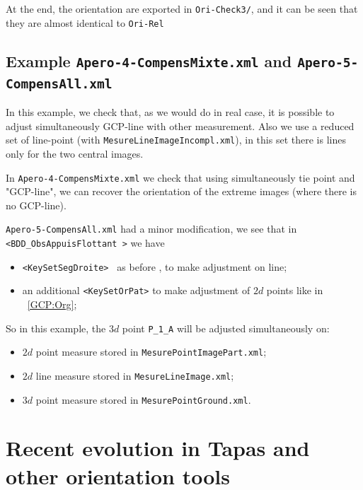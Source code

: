 At the end, the orientation are exported in {\tt Ori-Check3/}, and it can be seen that they are almost identical to {\tt Ori-Rel}



\subsection{Example {\tt Apero-4-CompensMixte.xml} and  {\tt  Apero-5-CompensAll.xml}}

In this example, we check that, as we would do in real case, it is possible to adjust simultaneously GCP-line with
other measurement. Also we use a reduced set of line-point (with {\tt MesureLineImageIncompl.xml}), in this set
there is lines only for the two central images.

In {\tt Apero-4-CompensMixte.xml} we check that using simultaneously tie point and "GCP-line", we can recover the orientation
of the extreme images (where there is no GCP-line).

{\tt  Apero-5-CompensAll.xml} had a minor modification, we see that in {\tt <BDD\_ObsAppuisFlottant >} we have

\begin{itemize}
   \item  {\tt <KeySetSegDroite> } as before , to make adjustment on line;
   \item an additional {\tt  <KeySetOrPat>} to make adjustment of $2d$ points like in  ~\ref{GCP:Org};

\end{itemize}

So in this example, the $3d$ point {\tt P\_1\_A} will be adjusted simultaneously on:

\begin{itemize}
    \item $2d$ point measure stored in {\tt MesurePointImagePart.xml};
    \item $2d$ line measure stored in {\tt MesureLineImage.xml};
    \item $3d$ point measure stored in {\tt MesurePointGround.xml}.
\end{itemize}

\section{Recent evolution in Tapas and other orientation tools}

